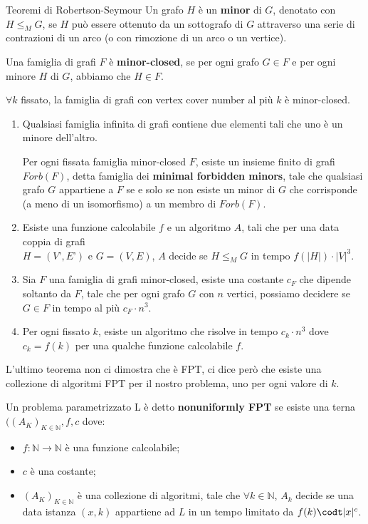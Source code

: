 \documentclass[10pt,a4paper]{article}
\begin{document}
\begin{multicols}{3}
\begin{textbox}{Teoremi di Robertson-Seymour}
Un grafo \(H\) è un \textbf{minor} di \(G\), denotato con \(H \leq_M G\), se \(H\)
può essere ottenuto da un sottografo di \(G\) attraverso una serie di
contrazioni di un arco (o con rimozione di un arco o un vertice).

Una famiglia di grafi \(F\) è \textbf{minor-closed}, se per ogni grafo \(G \in F\) e
per ogni minore \(H\) di \(G\), abbiamo che \(H \in F\).

\(\forall k\) fissato, la famiglia di grafi con vertex cover
number al più \(k\) è minor-closed.

\begin{enumerate}[leftmargin=*]
    \item Qualsiasi famiglia infinita di grafi contiene due elementi tali che uno è un minore dell’altro.
    
    Per ogni fissata famiglia minor-closed \(F\), esiste un insieme finito di grafi \(Forb(F)\), detta famiglia dei \textbf{minimal forbidden minors}, tale che qualsiasi grafo \(G\) appartiene a \(F\) se e solo se non esiste un minor di \(G\) che corrisponde (a meno di un isomorfismo) a un membro di \(Forb(F)\).
    \item Esiste una funzione calcolabile \(f\) e un algoritmo \(A\), tali che per una data coppia di grafi\\\(H=(V’,E’)\) e \(G=(V,E)\), \(A\) decide se \(H \leq_M G\) in tempo \(f(|H|)\cdot |V|^3\).
    \item Sia \(F\) una famiglia di grafi minor-closed, esiste una costante \(c_F\) che dipende soltanto da \(F\), tale che per ogni grafo \(G\) con \(n\) vertici, possiamo decidere se \(G\in F\) in tempo al più \(c_F\cdot n^3\).
    \item Per ogni fissato \(k\), esiste un algoritmo che risolve  in tempo \(c_k\cdot n^3\) dove \(c_k=f(k)\) per una qualche funzione calcolabile \(f\).
\end{enumerate}
L'ultimo teorema non ci dimostra che  è FPT, 
ci dice però che esiste una collezione di algoritmi FPT per
il nostro problema, uno per ogni valore di \(k\).

Un problema parametrizzato L è detto \textbf{nonuniformly FPT}
se esiste una terna \(((A_K)_{K\in \mathbb{N}},f,c\) dove:
\begin{itemize}[leftmargin=*]
    \item \(f:\mathbb{N} \rightarrow \mathbb{N}\) è una funzione calcolabile;
    \item \(c\) è una costante;
    \item \((A_K)_{K\in \mathbb{N}}\) è una collezione di algoritmi, tale che
    \(\forall k \in \mathbb{N}\), \(A_k\) decide se una data istanza \((x,k)\)
    appartiene ad \(L\) in un tempo limitato da \(f(k)\codt |x|^c\).
\end{itemize}
\end{textbox}


\end{multicols}
\end{document}
